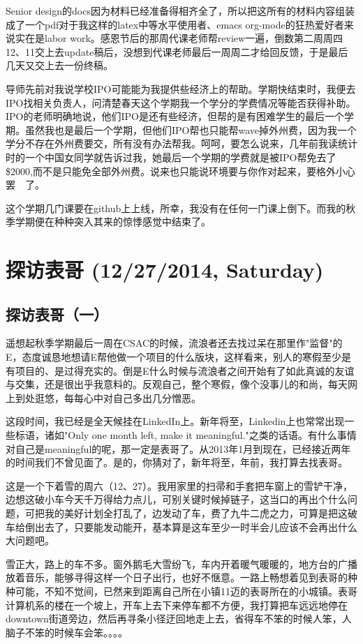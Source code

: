 \documentclass[12pt]{book}
\begin{document}
Senior design的docs因为材料已经准备得相齐全了，所以把这所有的材料内容组装成了一个pdf对于我这样的latex中等水平使用者、emacs org-mode的狂热爱好者来说实在是labor work。感恩节后的那周代课老师帮review一遍，倒数第二周周四12、11交上去update稿后，没想到代课老师最后一周周二才给回反馈，于是最后几天又交上去一份终稿。

导师先前对我说学校IPO可能能为我提供些经济上的帮助。学期快结束时，我便去IPO找相关负责人，问清楚春天这个学期我一个学分的学费情况等能否获得补助。IPO的老师明确地说，他们IPO是还有些经济，但帮的是有困难学生的最后一个学期。虽然我也是最后一个学期，但他们IPO帮也只能帮wave掉外州费，因为我一个学分不存在外州费要交，所有没有办法帮我。呵呵，要怎么说来，几年前我读统计时的一个中国女同学就告诉过我，她最后一个学期的学费就是被IPO帮免去了\$2000,而不是只能免全部外州费。说来也只能说环境要与你作对起来，要格外小心罢　了。

这个学期几门课要在github上上线，所幸，我没有在任何一门课上倒下。而我的秋季学期便在种种突入其来的惊悸感觉中结束了。　

\chapter{探访表哥 (12/27/2014, Saturday)}
\label{sec-37}
\section{探访表哥（一）}
\label{sec-37-1}
遥想起秋季学期最后一周在CSAC的时候，流浪者还去找过呆在那里作"监督"的E，态度诚恳地想请E帮他做一个项目的什么版块，这样看来，别人的寒假至少是有项目的、是过得充实的。倒是E什么时候与流浪者之间开始有了如此真诚的友谊与交集，还是很出乎我意料的。反观自己，整个寒假，像个没事儿的和尚，每天网上到处逛悠，每每心中对自己多出几分憎恶。

这段时间，我已经是全天候挂在LinkedIn上。新年将至，Linkedin上也常常出现一些标语，诸如"Only one month left, make it meaningful."之类的话语。有什么事情对自己是meaningful的呢，那一定是表哥了。从2013年1月到现在，已经接近两年的时间我们不曾见面了。是的，你猜对了，新年将至，年前，我打算去找表哥。　

这是一个下着雪的周六（12、27）。我用家里的扫帚和手套把车窗上的雪铲干净，边想这破小车今天千万得给力点儿，可别关键时候掉链子，这当口的再出个什么问题，可把我的美好计划全打乱了，边发动了车，费了九牛二虎之力，可算是把这破车给倒出去了，只要能发动能开，基本算是这车至少一时半会儿应该不会再出什么大问题吧。

雪正大，路上的车不多。窗外鹅毛大雪纷飞，车内开着暖气暖暖的，地方台的广播放着音乐，能够寻得这样一个日子出行，也好不惬意。一路上畅想着见到表哥的种种可能，不知不觉间，已然来到距离自己所在小镇11迈的表哥所在的小城镇。表哥计算机系的楼在一个坡上，开车上去下来停车都不方便，我打算把车远远地停在downtown街道旁边，然后再寻条小径迂回地走上去，省得车不笨的时候人笨，人脑子不笨的时候车会笨。。。。
\end{document}
